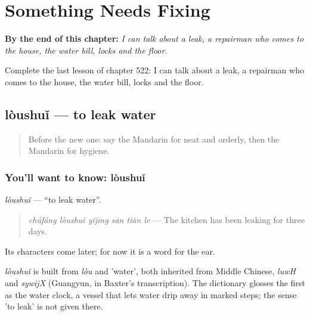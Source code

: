 
\chapter{Something Needs Fixing}
\label{ch:zh-something-needs-fixing}

\begin{chapteropening}
\textbf{By the end of this chapter:} \emph{I can talk about a leak, a repairman who comes to the house, the water bill, locks and the floor.}

Complete the last lesson of chapter 522: I can talk about a leak, a repairman who comes to the house, the water bill, locks and the floor.
\end{chapteropening}

\section[lòushuǐ]{lòushuǐ — to leak water}

\label{lesson:ZH-C522-loushui}



\begin{quote}
Before the new one: say the Mandarin for neat and orderly, then the Mandarin for hygiene.
\end{quote}

\subsection*{You'll want to know: lòushuǐ}
\emph{lòushuǐ} — \textquotedblleft{}to leak water\textquotedblright{}.

\begin{quote}
\emph{chúfáng lòushuǐ yǐjīng sān tiān le} — The kitchen has been leaking for three days.
\end{quote}

Its characters come later; for now it is a word for the ear.

\begin{cousinweb}
\emph{lòushuǐ} is built from \emph{lòu} and  'water', both inherited from Middle Chinese, \emph{luwH} and \emph{sywijX} (Guangyun, in Baxter's transcription). The dictionary glosses the first as the water clock, a vessel that lets water drip away in marked steps; the sense 'to leak' is not given there.
\end{cousinweb}

